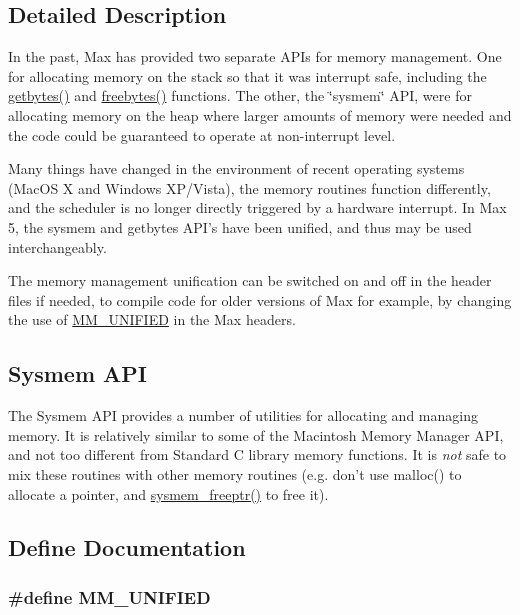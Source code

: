 \subsection{Detailed Description}
In the past, Max has provided two separate APIs for memory management. One for allocating memory on the stack so that it was interrupt safe, including the \hyperlink{group__memory_gaa513b95a076519ec168b62d85881f643}{getbytes()} and \hyperlink{group__memory_gaa1dc485c42515917ca377dbaf15b7dcd}{freebytes()} functions. The other, the \char`\"{}sysmem\char`\"{} API, were for allocating memory on the heap where larger amounts of memory were needed and the code could be guaranteed to operate at non-\/interrupt level.

Many things have changed in the environment of recent operating systems (MacOS X and Windows XP/Vista), the memory routines function differently, and the scheduler is no longer directly triggered by a hardware interrupt. In Max 5, the sysmem and getbytes API's have been unified, and thus may be used interchangeably.

The memory management unification can be switched on and off in the header files if needed, to compile code for older versions of Max for example, by changing the use of \hyperlink{group__memory_ga6ae185a510cc76224680e6156b843055}{MM\_\-UNIFIED} in the Max headers.\hypertarget{group__memory_The}{}\subsection{Sysmem API}\label{group__memory_The}
The Sysmem API provides a number of utilities for allocating and managing memory. It is relatively similar to some of the Macintosh Memory Manager API, and not too different from Standard C library memory functions. It is {\itshape not\/} safe to mix these routines with other memory routines (e.g. don’t use malloc() to allocate a pointer, and \hyperlink{group__memory_ga200c82639e547869db1f3887d17102d3}{sysmem\_\-freeptr()} to free it). 

\subsection{Define Documentation}
\hypertarget{group__memory_ga6ae185a510cc76224680e6156b843055}{
\subsubsection[{MM\_\-UNIFIED}]{\setlength{\rightskip}{0pt plus 5cm}\#define MM\_\-UNIFIED}}
\label{group__memory_ga6ae185a510cc76224680e6156b843055}


